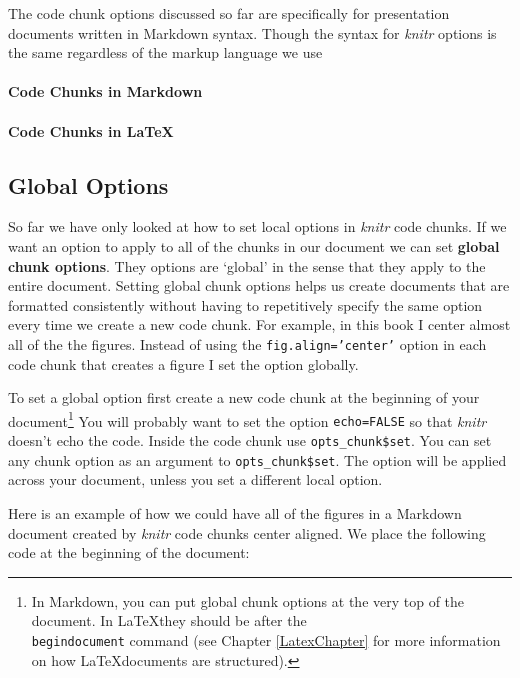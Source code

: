 \documentclass[ChapterTOCs,krantz1]{krantz}\usepackage{graphicx, color}
\begin{document}
The code chunk options discussed so far are specifically for presentation documents written in Markdown syntax. Though the syntax for {\emph{knitr}} options is the same regardless of the markup language we use 

\paragraph{Code Chunks in Markdown}

\paragraph{Code Chunks in \LaTeX}

\subsection{Global Options}

So far we have only looked at how to set local options in {\emph{knitr}} code chunks. If we want an option to apply to all of the chunks in our document we can set {\bf{global chunk options}}. They options are `global' in the sense that they apply to the entire document. Setting global chunk options helps us create documents that are formatted consistently without having to repetitively specify the same option every time we create a new code chunk. For example, in this book I center almost all of the the figures. Instead of using the {\tt{fig.align='center'}} option in each code chunk that creates a figure I set the option globally.

To set a global option first create a new code chunk at the beginning of your document\footnote{In Markdown, you can put global chunk options at the very top of the document. In \LaTeX they should be after the {\tt{\\begin{document}}} command (see Chapter \ref{LatexChapter} for more information on how \LaTeX documents are structured).} You will probably want to set the option {\tt{echo=FALSE}} so that {\emph{knitr}} doesn't echo the code. Inside the code chunk use {\tt{opts\_chunk\$set}}. You can set any chunk option as an argument to {\tt{opts\_chunk\$set}}. The option will be applied across your document, unless you set a different local option. 

Here is an example of how we could have all of the figures in a Markdown document created by {\emph{knitr}} code chunks center aligned. We place the following code at the beginning of the document:
\end{document}
